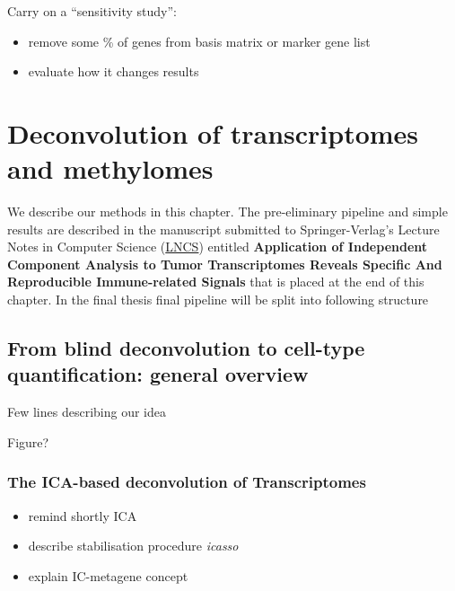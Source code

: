 \documentclass[12pt,]{book}
\providecommand{\tightlist}{%
  \setlength{\itemsep}{0pt}\setlength{\parskip}{0pt}}
\theoremstyle{definition}
\theoremstyle{definition}
\theoremstyle{definition}
\theoremstyle{remark}
\begin{document}
Carry on a ``sensitivity study'':

\begin{itemize}
\tightlist
\item
  remove some \% of genes from basis matrix or marker gene list
\item
  evaluate how it changes results
\end{itemize}

\hypertarget{deconica}{%
\chapter{Deconvolution of transcriptomes and
methylomes}\label{deconica}}

We describe our methods in this chapter. The pre-eliminary pipeline and
simple results are described in the manuscript submitted to
Springer-Verlag's Lecture Notes in Computer Science
(\href{http://www.springer.com/gb/computer-science/lncs}{LNCS}) entitled
\textbf{Application of Independent Component Analysis to Tumor
Transcriptomes Reveals Specific And Reproducible Immune-related Signals}
that is placed at the end of this chapter. In the final thesis final
pipeline will be split into following structure

\hypertarget{from-blind-deconvolution-to-cell-type-quantification-general-overview}{%
\section{From blind deconvolution to cell-type quantification: general
overview}\label{from-blind-deconvolution-to-cell-type-quantification-general-overview}}

Few lines describing our idea

Figure?

\hypertarget{the-ica-based-deconvolution-of-transcriptomes}{%
\subsection{The ICA-based deconvolution of
Transcriptomes}\label{the-ica-based-deconvolution-of-transcriptomes}}

\begin{itemize}
\tightlist
\item
  remind shortly ICA
\item
  describe stabilisation procedure \emph{icasso}
\item
  explain IC-metagene concept
\end{itemize}
\end{document}
